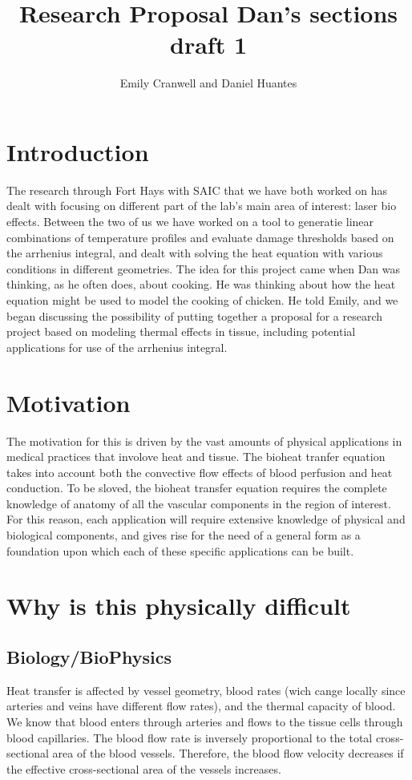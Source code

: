 \documentclass[12pt]{article}
\begin{document}
\title{Research Proposal
\large Dan's sections draft 1}
\author{Emily Cranwell and Daniel Huantes}
\maketitle
\section{Introduction}
The research through Fort Hays with SAIC that we have both worked on has dealt with focusing on different part of the lab's main area of interest: laser bio effects. Between the two of us  we have worked on a tool to generatie linear combinations of temperature profiles and evaluate damage thresholds based on the arrhenius integral, and dealt with solving the heat equation with various conditions in different geometries. The idea for this project came when Dan was thinking, as he often does, about cooking. He was thinking about how the heat equation might be used to model the cooking of chicken. He told Emily, and we began discussing the possibility of putting together a proposal for a research project based on modeling thermal effects in tissue, including potential applications for use of the arrhenius integral.

\section{Motivation}
\indent The motivation for this is driven by the vast amounts of physical applications in medical practices that involove heat and tissue. The bioheat tranfer equation takes into account both the convective flow effects of blood perfusion and heat conduction. To be sloved, the bioheat transfer equation requires the complete knowledge of anatomy of all the vascular components in the region of interest. For this reason, each application will require extensive knowledge of physical and biological components, and gives rise for the need of a general form as a foundation upon which each of these specific applications can be built. 

\section{Why is this physically difficult}

\subsection{Biology/BioPhysics}
Heat transfer is affected by vessel geometry, blood rates (wich cange locally since arteries and veins have different flow rates), and the thermal capacity of blood. We know that blood enters through arteries and flows to the tissue cells through blood capillaries. The blood flow rate is inversely proportional to the total cross-sectional area of the blood vessels. Therefore, the blood flow velocity decreases if the effective cross-sectional area of the vessels increases. 
\end{document}
